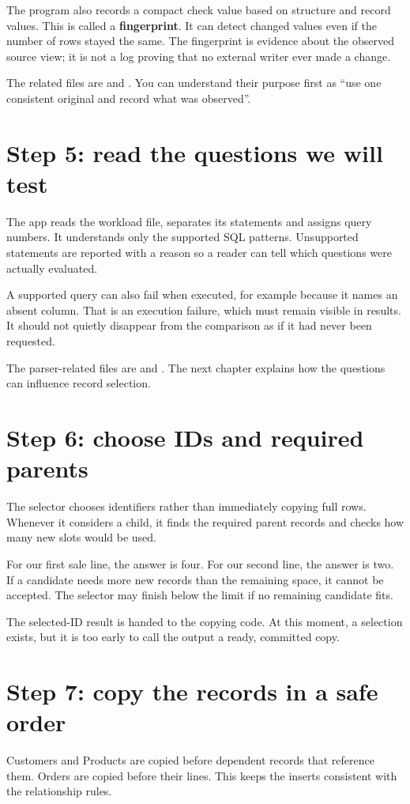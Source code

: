 \documentclass[12pt,a4paper,oneside]{report}
\begin{document}
The program also records a compact check value based on structure and record values. This is called a \textbf{fingerprint}. It can detect changed values even if the number of rows stayed the same. The fingerprint is evidence about the observed source view; it is not a log proving that no external writer ever made a change.

The related files are  and . You can understand their purpose first as ``use one consistent original and record what was observed''.

\section{Step 5: read the questions we will test}
The app reads the workload file, separates its statements and assigns query numbers. It understands only the supported SQL patterns. Unsupported statements are reported with a reason so a reader can tell which questions were actually evaluated.

A supported query can also fail when executed, for example because it names an absent column. That is an execution failure, which must remain visible in results. It should not quietly disappear from the comparison as if it had never been requested.

The parser-related files are  and . The next chapter explains how the questions can influence record selection.

\section{Step 6: choose IDs and required parents}
The selector chooses identifiers rather than immediately copying full rows. Whenever it considers a child, it finds the required parent records and checks how many new slots would be used.

For our first sale line, the answer is four. For our second line, the answer is two. If a candidate needs more new records than the remaining space, it cannot be accepted. The selector may finish below the limit if no remaining candidate fits.

The selected-ID result is handed to the copying code. At this moment, a selection exists, but it is too early to call the output a ready, committed copy.

\section{Step 7: copy the records in a safe order}
Customers and Products are copied before dependent records that reference them. Orders are copied before their lines. This keeps the inserts consistent with the relationship rules.
\end{document}
